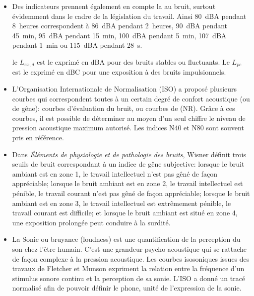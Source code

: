 {\begin{itemize}
   \item Des indicateurs prennent également en compte la  au bruit, surtout évidemment dans le cadre de la législation du travail.
    Ainsi 80~dBA pendant 8~heures correspondent à 86~dBA pendant 2~heures, 90~dBA pendant 45~min, 95~dBA pendant 15~min, 100~dBA pendant 5~min, 107~dBA pendant 1~min ou 115~dBA pendant 28~s.
    
    le $L_{ex,d}$ est le  exprimé en dBA pour des bruits stables ou fluctuants.
    Le $L_{pc}$ est le  exprimé en dBC pour une exposition à des bruits impulsionnels.
    

   \item L'Organisation Internationale de Normalisation (ISO) a proposé plusieurs courbes qui correspondent toutes à un certain degré de confort acoustique (ou de gêne): courbes d'évaluation du bruit, ou courbes de  (NR). Grâce à ces courbes, il est possible de déterminer au moyen d'un seul chiffre le niveau de pression acoustique maximum autorisé. Les indices N40 et N80 sont souvent pris en référence.

   \item Dans \emph{Éléments de physiologie et de pathologie des bruits}, Wisner définit trois seuils de bruit correspondant à un indice de gêne subjective: lorsque le bruit ambiant est en zone 1, le travail intellectuel n'est pas gêné de façon appréciable; lorsque le bruit ambiant est en zone 2, le travail intellectuel est pénible, le travail courant n'est pas gêné de façon appréciable; lorsque le bruit ambiant est en zone 3, le travail intellectuel est extrêmement pénible, le travail courant est difficile; et lorsque le bruit ambiant est situé en zone 4, une exposition prolongée peut conduire à la surdité.

   \item La Sonie ou bruyance (loudness) est une quantification de la perception du son chez l'être humain. C'est une grandeur psycho-acoustique qui se rattache de façon complexe à la pression acoustique. Les courbes isosoniques issues des travaux de Fletcher et Munson %
   expriment la relation entre la fréquence d'un stimulus sonore continu et la perception de sa sonie. L'ISO a donné un tracé normalisé afin de pouvoir définir le phone, unité de l'expression de la sonie.


\end{itemize}}

